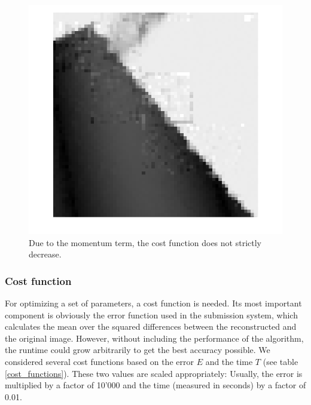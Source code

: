 \documentclass[10pt,conference,compsocconf]{IEEEtran}
\begin{document}
\begin{figure}
\centering
\includegraphics[width=\columnwidth]{images/framing_artifacts.png}
\caption{Due to the momentum term, the cost function does not strictly decrease.}
\label{gradient_descent_figure}
\end{figure}

\subsubsection{Cost function}
For optimizing a set of parameters, a cost function is needed. Its most important component is obviously the error function used in the submission system, which calculates the mean over the squared differences between the reconstructed and the original image. However, without including the performance of the algorithm, the runtime could grow arbitrarily to get the best accuracy possible. We considered several cost functions based on the error $E$ and the time $T$ (see table \ref{cost_functions}). These two values are scaled appropriately: Usually, the error is multiplied by a factor of 10'000 and the time (measured in seconds) by a factor of 0.01.
\end{document}
